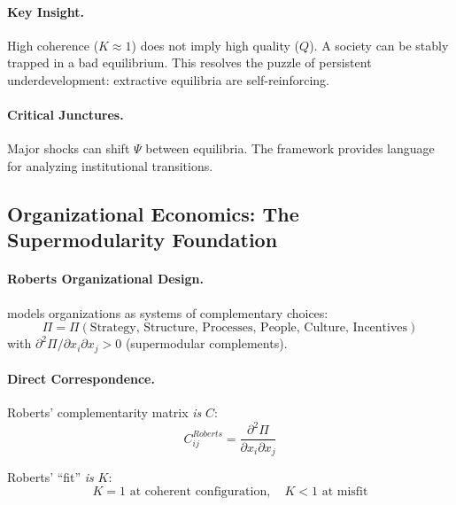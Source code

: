 \documentclass[12pt,a4paper]{article}
\begin{document}
\paragraph{Key Insight.}
High coherence ($K \approx 1$) does not imply high quality ($Q$).
A society can be stably trapped in a bad equilibrium.
This resolves the puzzle of persistent underdevelopment:
extractive equilibria are self-reinforcing.

\paragraph{Critical Junctures.}
Major shocks can shift $\Psi$ between equilibria.
The framework provides language for analyzing institutional transitions.

\subsection{Organizational Economics: The Supermodularity Foundation}

\paragraph{Roberts Organizational Design.}
\citet{roberts2004} models organizations as systems of complementary choices:
\begin{equation}
  \Pi = \Pi(\text{Strategy, Structure, Processes, People, Culture, Incentives})
\end{equation}
with $\partial^2 \Pi / \partial x_i \partial x_j > 0$ (supermodular complements).

\paragraph{Direct Correspondence.}
Roberts' complementarity matrix \emph{is} $C$:
\begin{equation}
  C^{Roberts}_{ij} = \frac{\partial^2 \Pi}{\partial x_i \partial x_j}
\end{equation}

Roberts' ``fit'' \emph{is} $K$:
\begin{equation}
  K = 1 \text{ at coherent configuration}, \quad K < 1 \text{ at misfit}
\end{equation}
\end{document}
